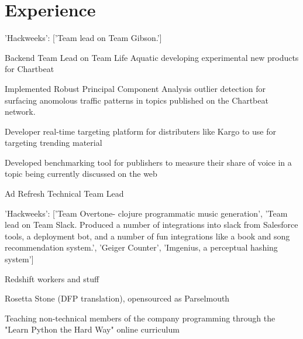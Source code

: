 \documentclass[]{deedy-resume-openfont}
\begin{document}
    
    \lastupdated
    

    \section{Experience}

    
                \begin{tightemize}
                    \item
                    {'Hackweeks': ['Team lead on Team Gibson.']}\item
                    Backend Team Lead on Team Life Aquatic developing experimental new products for Chartbeat\item
                    Implemented Robust Principal Component Analysis outlier detection for surfacing anomolous traffic patterns in topics published on the Chartbeat network.\item
                    Developer real-time targeting platform for distributers like Kargo to use for targeting trending material\item
                    Developed benchmarking tool for publishers to measure their share of voice in a topic being currently discussed on the web\item
                    Ad Refresh Technical Team Lead
                \end{tightemize}
            \sectionsep
        
                \begin{tightemize}
                    \item
                    {'Hackweeks': ['Team Overtone- clojure programmatic music generation', 'Team lead on Team Slack. Produced a number of integrations into slack from Salesforce tools, a deployment bot, and a number of fun integrations like a book and song recommendation system.', 'Geiger Counter', 'Imgenius, a perceptual hashing system']}\item
                    Redshift workers and stuff\item
                    Rosetta Stone (DFP translation), opensourced as Parselmouth\item
                    Teaching non-technical members of the company programming through the "Learn Python the Hard Way" online curriculum

                \end{tightemize}
            \sectionsep
        
\end{document}
